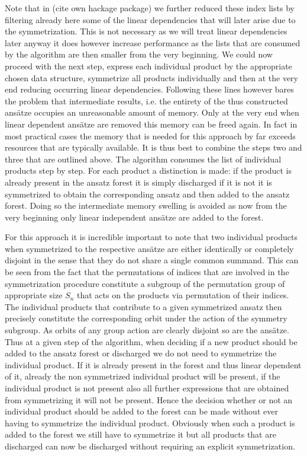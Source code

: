 \documentclass[a4paper,12pt, DIV=14, BCOR=5mm, twoside, headsepline]{scrbook}
\begin{document}
Note that in (cite own hackage package) we further reduced these index lists by filtering already here some of the linear dependencies that will later arise due to the symmetrization. This is not necessary as we will treat linear dependencies later anyway it does however increase performance as the lists that are consumed by the algorithm are then smaller from the very beginning.  
We could now proceed with the next step, express each individual product by the appropriate chosen data structure, symmetrize all products individually and then at the very end reducing occurring linear dependencies. Following these lines however bares the problem that intermediate results, i.e. the entirety of the thus constructed ansätze occupies an unreasonable amount of memory. Only at the very end when linear dependent ansätze are removed this memory can be freed again. In fact in most practical cases the memory that is needed for this approach by far exceeds resources that are typically available. It is thus best to combine the steps two and three that are outlined above. The algorithm consumes the list of individual products step by step. For each product a distinction is made: if the product is already present in the ansatz forest it is simply discharged if it is not it is symmetrized to obtain the corresponding ansatz and then added to the ansatz forest. Doing so the intermediate memory swelling is avoided as now from the very beginning only linear independent ansätze are added to the forest.

For this approach it is incredible important to note that two individual products when symmetrized to the respective ansätze are either identically or completely disjoint in the sense that they do not share a single common summand. This can be seen from the fact that the permutations of indices that are involved in the symmetrization procedure constitute a subgroup of the permutation group of appropriate size $S_n$ that acts on the products via permutation of their indices. The individual products that contribute to a given symmetrized ansatz then precisely constitute the corresponding orbit under the action of the symmetry subgroup. As orbits of any group action are clearly disjoint so are the ansätze. Thus at a given step of the algorithm, when deciding if a new product should be added to the ansatz forest or discharged we do not need to symmetrize the individual product. If it is already present in the forest and thus linear dependent of it, already the non symmetrized individual product will be present, if the individual product is not present also all further expressions that are obtained from symmetrizing it will not be present. Hence the decision whether or not an individual product should be added to the forest can be made without ever having to symmetrize the individual product. Obviously when such a product is added to the forest we still have to symmetrize it but all products that are discharged can now be discharged without requiring an explicit symmetrization. 
\end{document}
